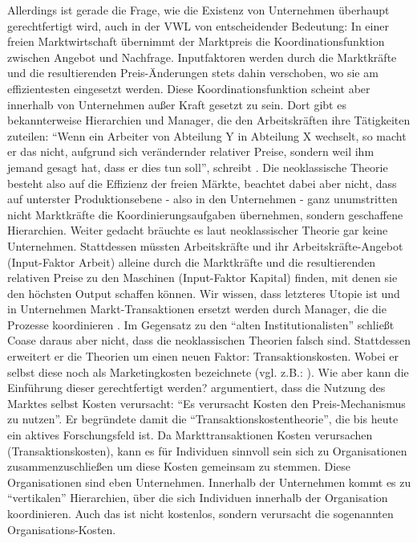 Allerdings ist gerade die Frage, wie die Existenz von Unternehmen überhaupt gerechtfertigt wird, auch in der VWL von entscheidender Bedeutung: In einer freien Marktwirtschaft übernimmt der Marktpreis die Koordinationsfunktion zwischen Angebot und Nachfrage. Inputfaktoren werden durch die Marktkräfte und die resultierenden Preis-Änderungen stets dahin verschoben, wo sie am effizientesten eingesetzt werden. Diese Koordinationsfunktion scheint aber innerhalb von Unternehmen außer Kraft gesetzt zu sein. Dort gibt es bekannterweise Hierarchien und Manager, die den Arbeitskräften ihre Tätigkeiten zuteilen: "`Wenn ein Arbeiter von Abteilung Y in Abteilung X wechselt, so macht er das nicht, aufgrund sich verändernder relativer Preise, sondern weil ihm jemand gesagt hat, dass er dies tun soll"', schreibt \textcite[S. 387]{Coase1937}. Die neoklassische Theorie besteht also auf die Effizienz der freien Märkte, beachtet dabei aber nicht, dass auf unterster Produktionsebene - also in den Unternehmen - ganz unumstritten nicht Marktkräfte die Koordinierungsaufgaben übernehmen, sondern geschaffene Hierarchien. Weiter gedacht bräuchte es laut neoklassischer Theorie gar keine Unternehmen. Stattdessen müssten Arbeitskräfte und ihr Arbeitskräfte-Angebot (Input-Faktor Arbeit) alleine durch die Marktkräfte und die resultierenden relativen Preise zu den Maschinen (Input-Faktor Kapital) finden, mit denen sie den höchsten Output schaffen können. Wir wissen, dass letzteres Utopie ist und in Unternehmen Markt-Transaktionen ersetzt werden durch Manager, die die Prozesse koordinieren \parencite[S. 388]{Coase1937}. Im Gegensatz zu den "`alten Institutionalisten"' schließt Coase daraus aber nicht, dass die neoklassischen Theorien falsch sind. Stattdessen erweitert er die Theorien um einen neuen Faktor: Transaktionskosten. Wobei er selbst diese noch als Marketingkosten bezeichnete (vgl. z.B.: \textcite[S. 392]{Coase1937}). Wie aber kann die Einführung dieser gerechtfertigt werden? \textcite[S. 390]{Coase1937} argumentiert, dass die Nutzung des Marktes selbst Kosten verursacht: "`Es verursacht Kosten den Preis-Mechanismus zu nutzen"'. Er begründete damit die  "`Transaktionskostentheorie"', die bis heute ein aktives Forschungsfeld ist. Da Markttransaktionen Kosten verursachen (Transaktionskosten), kann es für Individuen sinnvoll sein sich zu Organisationen zusammenzuschließen um diese Kosten gemeinsam zu stemmen. Diese Organisationen sind eben Unternehmen. Innerhalb der Unternehmen kommt es zu "`vertikalen"' \parencite[S. 388]{Coase1937} Hierarchien, über die sich Individuen innerhalb der Organisation koordinieren. Auch das ist nicht kostenlos, sondern verursacht die sogenannten Organisations-Kosten.

